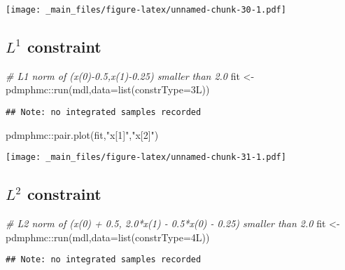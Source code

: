 \documentclass[
]{book}
\newenvironment{Shaded}{\begin{snugshade}}{\end{snugshade}}
\newcommand{\AttributeTok}[1]{\textcolor[rgb]{0.77,0.63,0.00}{#1}}
\newcommand{\CommentTok}[1]{\textcolor[rgb]{0.56,0.35,0.01}{\textit{#1}}}
\newcommand{\FunctionTok}[1]{\textcolor[rgb]{0.00,0.00,0.00}{#1}}
\newcommand{\NormalTok}[1]{#1}
\newcommand{\OtherTok}[1]{\textcolor[rgb]{0.56,0.35,0.01}{#1}}
\newcommand{\SpecialCharTok}[1]{\textcolor[rgb]{0.00,0.00,0.00}{#1}}
\newcommand{\StringTok}[1]{\textcolor[rgb]{0.31,0.60,0.02}{#1}}
\begin{document}
\texttt{[image: \_main\_files/figure-latex/unnamed-chunk-30-1.pdf]}

\hypertarget{l1-constraint}{%
\subsection{\texorpdfstring{\(L^1\) constraint}{L\^{}1 constraint}}\label{l1-constraint}}

\begin{Shaded}
\begin{Highlighting}[]
\CommentTok{\# L1 norm of (x(0){-}0.5,x(1){-}0.25) smaller than 2.0}
\NormalTok{fit }\OtherTok{\textless{}{-}}\NormalTok{ pdmphmc}\SpecialCharTok{::}\FunctionTok{run}\NormalTok{(mdl,}\AttributeTok{data=}\FunctionTok{list}\NormalTok{(}\AttributeTok{constrType=}\NormalTok{3L))}
\end{Highlighting}
\end{Shaded}

\begin{verbatim}
## Note: no integrated samples recorded
\end{verbatim}

\begin{Shaded}
\begin{Highlighting}[]
\NormalTok{pdmphmc}\SpecialCharTok{::}\FunctionTok{pair.plot}\NormalTok{(fit,}\StringTok{"x[1]"}\NormalTok{,}\StringTok{"x[2]"}\NormalTok{)}
\end{Highlighting}
\end{Shaded}

\texttt{[image: \_main\_files/figure-latex/unnamed-chunk-31-1.pdf]}

\hypertarget{l2-constraint}{%
\subsection{\texorpdfstring{\(L^2\) constraint}{L\^{}2 constraint}}\label{l2-constraint}}

\begin{Shaded}
\begin{Highlighting}[]
\CommentTok{\# L2 norm of (x(0) + 0.5, 2.0*x(1) {-} 0.5*x(0) {-} 0.25) smaller than 2.0}
\NormalTok{fit }\OtherTok{\textless{}{-}}\NormalTok{ pdmphmc}\SpecialCharTok{::}\FunctionTok{run}\NormalTok{(mdl,}\AttributeTok{data=}\FunctionTok{list}\NormalTok{(}\AttributeTok{constrType=}\NormalTok{4L))}
\end{Highlighting}
\end{Shaded}

\begin{verbatim}
## Note: no integrated samples recorded
\end{verbatim}
\end{document}
